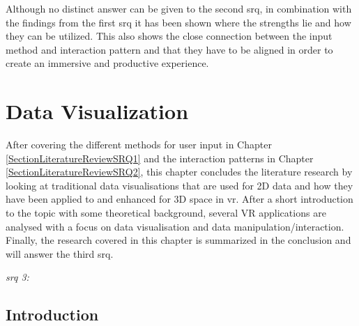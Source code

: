 Although no distinct answer can be given to the second \gls{srq}, in combination with the findings from the first \gls{srq} it has been shown where the strengths lie and how they can be utilized. This also shows the close connection between the input method and interaction pattern and that they have to be aligned in order to create an immersive and productive experience.



\section{Data Visualization}

\label{SectionLiteratureReviewSRQ3}

After covering the different methods for user input in Chapter \ref{SectionLiteratureReviewSRQ1} and the interaction patterns in Chapter \ref{SectionLiteratureReviewSRQ2}, this chapter concludes the literature research by looking at traditional data visualisations that are used for 2D data and how they have been applied to and enhanced for 3D space in \gls{vr}. After a short introduction to the topic with some theoretical background, several VR applications are analysed with a focus on data visualisation and data manipulation/interaction. Finally, the research covered in this chapter is summarized in the conclusion and will answer the third \gls{srq}.
\begin{framed}
	\textit{\gls{srq} 3: \srqthreetext}
\end{framed}



\subsection{Introduction}


